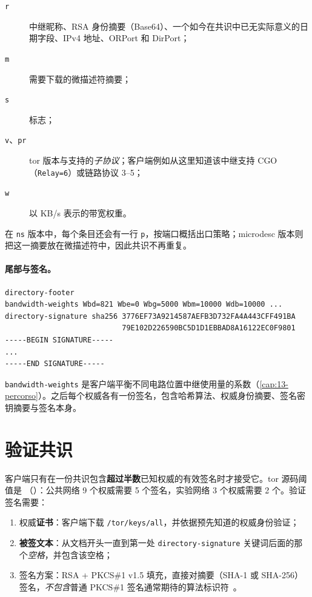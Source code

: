 \begin{description}
  \item[\texttt{r}] 中继昵称、RSA 身份摘要（Base64）、一个如今在共识中已无实际意义的日期字段、IPv4 地址、ORPort 和 DirPort；
  \item[\texttt{m}] 需要下载的微描述符摘要；
  \item[\texttt{s}] 标志；
  \item[\texttt{v}、\texttt{pr}] tor 版本与支持的\emph{子协议}；客户端例如从这里知道该中继支持 CGO（\texttt{Relay=6}）或链路协议 3--5；
  \item[\texttt{w}] 以 KB/s 表示的带宽权重。
\end{description}

在 \texttt{ns} 版本中，每个条目还会有一行 \texttt{p}，按端口概括出口策略；microdesc 版本则把这一摘要放在微描述符中，因此共识不再重复。

\paragraph{尾部与签名。}
\begin{lstlisting}[numbers=none]
directory-footer
bandwidth-weights Wbd=821 Wbe=0 Wbg=5000 Wbm=10000 Wdb=10000 ...
directory-signature sha256 3776EF73A9214587AEFB3D732FA4A443CFF491BA
                           79E102D226590BC5D1D1EBBAD8A16122EC0F9801
-----BEGIN SIGNATURE-----
...
-----END SIGNATURE-----
\end{lstlisting}

\texttt{bandwidth-weights} 是客户端平衡不同电路位置中继使用量的系数（\cref{cap:13-percorso}）。之后每个权威各有一份签名，包含哈希算法、权威身份摘要、签名密钥摘要与签名本身。

\section{验证共识}\label{sec:dir-firme}

客户端只有在一份共识包含\textbf{超过半数}已知权威的有效签名时才接受它。tor 源码阈值是 （）：公共网络 9 个权威需要 5 个签名，实验网络 3 个权威需要 2 个。验证签名需要：
\begin{enumerate}
  \item 权威\textbf{证书}：客户端下载 \nolinkurl{/tor/keys/all}，并依据预先知道的权威身份验证；
  \item \textbf{被签文本}：从文档开头一直到第一处 \texttt{directory-signature} 关键词后面的那个\emph{空格}，并包含该空格；
  \item 签名方案：RSA + PKCS\#1 v1.5 填充，直接对摘要（SHA-1 或 SHA-256）签名，\emph{不包含}普通 PKCS\#1 签名通常期待的算法标识符~。
\end{enumerate}

